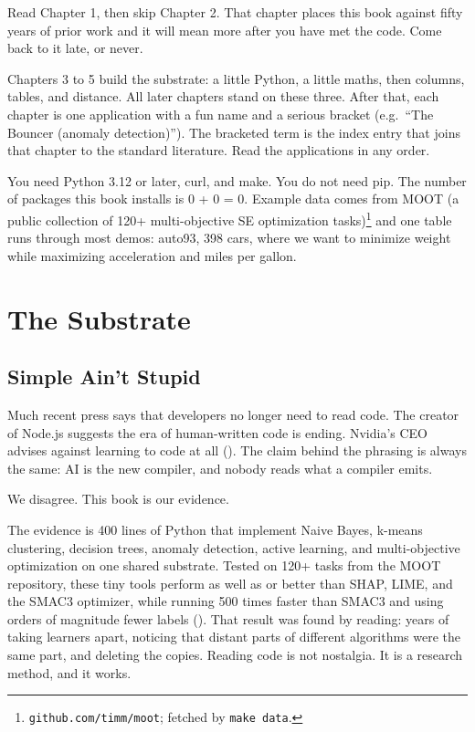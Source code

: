 \documentclass[
  justified]{tufte-book}
\begin{document}
Read Chapter 1, then skip Chapter 2. That chapter places this book
against fifty years of prior work and it will mean more after you have
met the code. Come back to it late, or never.

Chapters 3 to 5 build the substrate: a little Python, a little maths,
then columns, tables, and distance. All later chapters stand on these
three. After that, each chapter is one application with a fun name and a
serious bracket (e.g.~``The Bouncer (anomaly detection)''). The
bracketed term is the index entry that joins that chapter to the
standard literature. Read the applications in any order.

You need Python 3.12 or later, curl, and make. You do not need pip. The
number of packages this book installs is 0 + 0 = 0. Example data comes
from MOOT (a public collection of 120+ multi-objective SE optimization
tasks)\footnote{\texttt{github.com/timm/moot}; fetched by
  \texttt{make\ data}.} and one table runs through most demos: auto93,
398 cars, where we want to minimize weight while maximizing acceleration
and miles per gallon.

\part{The Substrate}

\chapter{Simple Ain't Stupid}\label{simple-aint-stupid}

Much recent press says that developers no longer need to read code. The
creator of Node.js suggests the era of human-written code is ending.
Nvidia's CEO advises against learning to code at all
(). The claim
behind the phrasing is always the same: AI is the new compiler, and
nobody reads what a compiler emits.

We disagree. This book is our evidence.

The evidence is 400 lines of Python that implement Naive Bayes, k-means
clustering, decision trees, anomaly detection, active learning, and
multi-objective optimization on one shared substrate. Tested on 120+
tasks from the MOOT repository, these tiny tools perform as well as or
better than SHAP, LIME, and the SMAC3 optimizer, while running 500 times
faster than SMAC3 and using orders of magnitude fewer labels
(). That result
was found by reading: years of taking learners apart, noticing that
distant parts of different algorithms were the same part, and deleting
the copies. Reading code is not nostalgia. It is a research method, and
it works.
\end{document}
